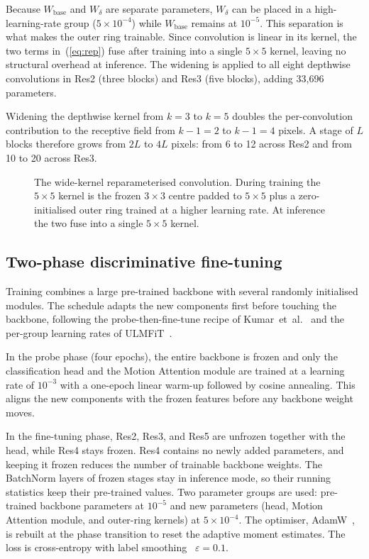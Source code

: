 \documentclass[conference]{IEEEtran}
\begin{document}
Because $W_{\text{base}}$ and $W_\delta$ are separate parameters,
$W_\delta$ can be placed in a high-learning-rate group
($5 \times 10^{-4}$) while $W_{\text{base}}$ remains at $10^{-5}$.
This separation is what makes the outer ring trainable. Since
convolution is linear in its kernel, the two terms in~(\ref{eq:rep})
fuse after training into a single $5 \times 5$ kernel, leaving no
structural overhead at inference. The widening is applied to all eight
depthwise convolutions in Res2 (three blocks) and Res3 (five blocks),
adding 33{,}696 parameters.

Widening the depthwise kernel from $k=3$ to $k=5$ doubles the
per-convolution contribution to the receptive field from $k-1=2$ to
$k-1=4$ pixels. A stage of $L$ blocks therefore grows from $2L$ to
$4L$ pixels: from 6 to 12 across Res2 and from 10 to 20 across Res3.

\begin{figure}[t]
  \centering
  \caption{The wide-kernel reparameterised convolution. During training
  the $5 \times 5$ kernel is the frozen $3 \times 3$ centre padded to
  $5 \times 5$ plus a zero-initialised outer ring trained at a higher
  learning rate. At inference the two fuse into a single $5 \times 5$
  kernel.}
  \label{fig:wk}
\end{figure}

\subsection{Two-phase discriminative fine-tuning}

Training combines a large pre-trained backbone with several randomly
initialised modules. The schedule adapts the new components first
before touching the backbone, following the probe-then-fine-tune
recipe of Kumar~et~al.~\cite{lpft} and the per-group learning rates of
ULMFiT~\cite{ulmfit}.

In the probe phase (four epochs), the entire backbone is frozen and
only the classification head and the Motion Attention module are
trained at a learning rate of $10^{-3}$ with a one-epoch linear
warm-up followed by cosine annealing. This aligns the new components
with the frozen features before any backbone weight moves.

In the fine-tuning phase, Res2, Res3, and Res5 are unfrozen together
with the head, while Res4 stays frozen. Res4 contains no newly added
parameters, and keeping it frozen reduces the number of trainable
backbone weights. The BatchNorm layers of frozen stages stay in
inference mode, so their running statistics keep their pre-trained
values. Two parameter groups are used: pre-trained backbone
parameters at $10^{-5}$ and new parameters (head, Motion Attention
module, and outer-ring kernels) at $5 \times 10^{-4}$. The optimiser,
AdamW~\cite{adamw}, is rebuilt at the phase transition to reset the
adaptive moment estimates. The loss is cross-entropy with label
smoothing~\cite{labelsmoothing} $\varepsilon = 0.1$.
\end{document}
